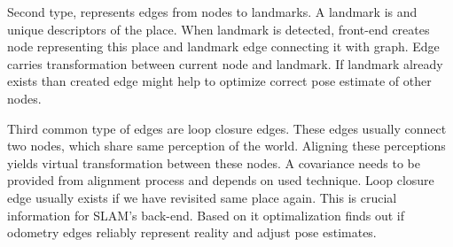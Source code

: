 Second type, represents edges from nodes to landmarks. A landmark is and unique descriptors of the place. When landmark is detected, front-end creates node representing this place and landmark edge connecting it with graph. Edge carries transformation between current node and landmark. If landmark already exists than created edge might help to optimize correct pose estimate of other nodes.

   
Third common type of edges are loop closure edges. These edges usually connect two nodes, which share same perception of the world. Aligning these perceptions yields virtual transformation between these nodes. A covariance needs to be provided from alignment process and depends on used technique. Loop closure edge usually exists if we have revisited same place again. This is crucial information for \gls{SLAM}'s back-end. Based on it optimalization finds out if odometry edges reliably represent reality and adjust pose estimates.


